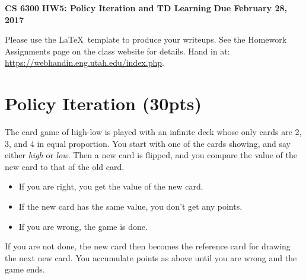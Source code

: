 \documentclass[12pt]{article}
\begin{document}
\begin{center}
{\bf CS 6300} \hfill {\large\bf HW5: Policy Iteration and TD Learning} \hfill {\bf Due February 28, 2017}
\end{center}

\noindent
Please use the \LaTeX\ template to produce your writeups. See the
Homework Assignments page on the class website for details.  Hand in
at: \url{https://webhandin.eng.utah.edu/index.php}.

\section{Policy Iteration (30pts)}

The card game of high-low is played with an infinite deck whose only
cards are 2, 3, and 4 in equal proportion.  You start with one of the
cards showing, and say either {\it high} or {\it low}.  Then a new
card is flipped, and you compare the value of the new card to that of
the old card.

\begin{itemize}

\item If you are right, you get the value of the new card.

\item If the new card has the same value, you don't get any points.

\item If you are wrong, the game is done.

\end{itemize}

\noindent
If you are not done, the new card then becomes the reference card for
drawing the next new card.  You accumulate points as above until you
are wrong and the game ends.
\end{document}
